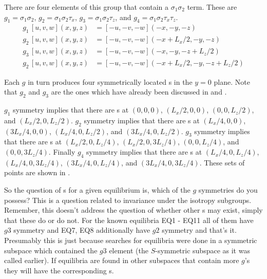 \documentclass[letter,10pt,openany]{article}
\begin{document}
There are four elements of this group that contain a
$\sigma_{1}\sigma_{2}$ term. These are $g_1 = \sigma_{1}\sigma_{2}$,
$g_2 = \sigma_{1}\sigma_{2}\tau_{x}$, $g_3 =
\sigma_{1}\sigma_{2}\tau_{z}$, and $g_4 = \sigma_{1}\sigma_{2}\tau_x
\tau_z$. 
\begin{align}
g_1 \, [u,v,w](x,y,z) &= [-u,-v,-w](-x,-y,-z)  \\
g_2 \, [u,v,w](x,y,z) &= [-u,-v,-w](-x+L_{x}/2,-y,-z)  \\
g_3 \, [u,v,w](x,y,z) &= [-u,-v,-w](-x,-y,-z+L_{z}/2)  \\
g_2 \, [u,v,w](x,y,z) &= [-u,-v,-w](-x+L_{x}/2,-y,-z+L_{z}/2)
\end{align}

Each $g$ in turn produces four symmetrically located \stagp s in the
$y = 0$ plane. Note that $g_2$ and $g_3$ are the ones which have
already been discussed in  and
.

 $g_1$ symmetry implies that there are \stagp s at $(0,0,0)$, $(L_{x}/2,0,0)$, $(0,0,L_{z}/2)$, and
$(L_{x}/2,0,L_{z}/2)$. $g_2$ symmetry implies that there are \stagp
s at $(L_{x}/4,0,0)$, $(3L_{x}/4,0,0)$, $(L_{x}/4,0,L_{z}/2)$, and
$(3L_{x}/4,0,L_{z}/2)$. $g_3$ symmetry implies that there are \stagp
s at $(L_{x}/2,0,L_{z}/4)$, $(L_{x}/2,0,3L_{z}/4)$, $(0,0,L_{z}/4)$,
and $(0,0,3L_{z}/4)$. Finally $g_4$ symmetry implies that there are
\stagp s at $(L_{x}/4,0,L_{z}/4)$, $(L_{x}/4,0,3L_{z}/4)$,
$(3L_{x}/4,0,L_{z}/4)$, and $(3L_{x}/4,0,3L_{z}/4)$. These sets of
points are shown in .

So the question of \stagp s for a given equilibrium is, which of the
$g$ symmetries do you possess? This is a question related to
invariance under the isotropy subgroups. Remember, this doesn't
address the question of whether other \stagp s may exist, simply
that these do or do not. For the known equilibria EQ1 - EQ11 all of
them have $g3$ symmetry and EQ7, EQ8 additionally have $g2$ symmetry
and that's it. Presumably this is just because searches for
equilibria were done in a symmetric subspace which contained the
$g3$ element (the $S$-symmetric subspace as it was called earlier).
If equilibria are found in other subspaces that contain more $g$'s
they will have the corresponding \stagp s.
\end{document}
